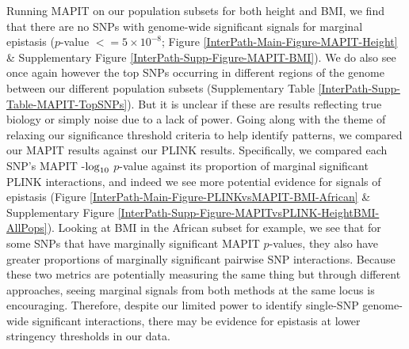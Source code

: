 \documentclass[12pt,a4paper]{article}
\def\log{{\rm log}}
\begin{document}
Running MAPIT on our population subsets for both height and BMI, we find that there are no SNPs with genome-wide significant signals for marginal epistasis ($p$-value $<= 5\times10^{-8}$; Figure \ref{InterPath-Main-Figure-MAPIT-Height} \& Supplementary Figure \ref{InterPath-Supp-Figure-MAPIT-BMI}). We do also see once again however the top SNPs occurring in different regions of the genome between our different population subsets (Supplementary Table \ref{InterPath-Supp-Table-MAPIT-TopSNPs}). But it is unclear if these are results reflecting true biology or simply noise due to a lack of power. Going along with the theme of relaxing our significance threshold criteria to help identify patterns, we compared our MAPIT results against our PLINK results. Specifically, we compared each SNP's MAPIT -$\log_{10}$ $p$-value against its proportion of marginal significant PLINK interactions, and indeed we see more potential evidence for signals of epistasis (Figure \ref{InterPath-Main-Figure-PLINKvsMAPIT-BMI-African} \& Supplementary Figure \ref{InterPath-Supp-Figure-MAPITvsPLINK-HeightBMI-AllPops}). Looking at BMI in the African subset for example, we see that for some SNPs that have marginally significant MAPIT $p$-values, they also have greater proportions of marginally significant pairwise SNP interactions. Because these two metrics are potentially measuring the same thing but through different approaches, seeing marginal signals from both methods at the same locus is encouraging. Therefore, despite our limited power to identify single-SNP genome-wide significant interactions, there may be evidence for epistasis at lower stringency thresholds in our data.
\end{document}
